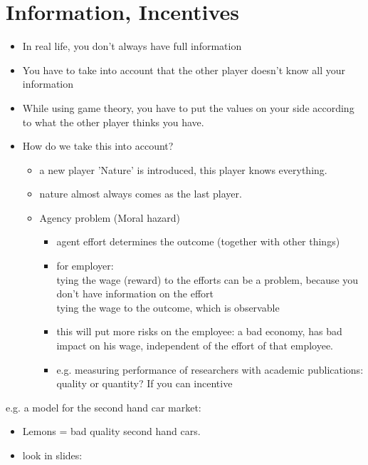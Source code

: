 \documentclass[12pt, a4paper, titlepage]{extarticle}
\begin{document}
\section{Information, Incentives}
\begin{itemize}
    \item In real life, you don't always have full information
    \item You have to take into account that the other player doesn't know all your information
    \item While using game theory, you have to put the values on your side according to what the other player thinks you have.
    \item How do we take this into account?
    \begin{itemize}
        \item a new player 'Nature' is introduced, this player knows everything.
        \item nature almost always comes as the last player.
        \item Agency problem (Moral hazard)
        \begin{itemize}
            \item agent effort determines the outcome (together with other things)
            \item for employer: \\ tying the wage (reward) to the efforts can be a problem, because you don't have information on the effort \\ tying the wage to the outcome, which is observable
            \item this will put more risks on the employee: a bad economy, has bad impact on his wage, independent of the effort of that employee.
            
            \item e.g. measuring performance of researchers with academic publications: quality or quantity? If you can incentive
        \end{itemize}
        
    \end{itemize}
\end{itemize}
e.g. a model for the second hand car market:
            \begin{itemize}
                \item Lemons = bad quality second hand cars.
                \item look in slides:
            \end{itemize}
    
\end{document}
